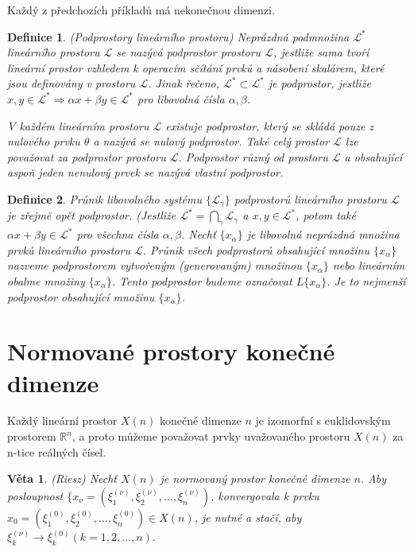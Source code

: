 \documentclass[a4paper, 11pt]{report}
\newtheorem{mydef}{Definice}[chapter]
\newtheorem{veta}{Věta}[chapter]
\begin{document}
Každý z předchozích příkladů má nekonečnou dimenzi.

\begin{mydef}
(Podprostory lineárního prostoru) Neprázdná podmnožina $\mathcal{L}^*$ lineárního prostoru $\mathcal{L}$ se nazývá \emph{podprostor} prostoru $\mathcal{L}$, jestliže sama tvoří lineární prostor vzhledem k operacím sčítání prvků a násobení skalárem, které jsou definovány v prostoru $\mathcal{L}$. Jinak řečeno, $\mathcal{L}^* \subset \mathcal{L}^*$ je podprostor, jestliže
$x,y \in \mathcal{L}^* \Rightarrow \alpha x + \beta y \in \mathcal{L}^*$
pro libovolná čísla $\alpha, \beta$.

V každém lineárním prostoru $\mathcal{L}$ existuje podprostor, který se skládá pouze z nulového prvku $\theta$ a nazývá se \emph{nulový podprostor}. Také celý prostor $\mathcal{L}$ lze považovat za podprostor prostoru $\mathcal{L}$. Podprostor různý od prostoru $\mathcal{L}$ a obsahující aspoň jeden nenulový prvek se nazývá \emph{vlastní podprostor}.
\end{mydef}

\begin{mydef}
Průnik libovolného systému $\{\mathcal{L}_\gamma\}$ podprostorů lineárního prostoru $\mathcal{L}$ je zřejmě opět podprostor.
(Jestliže $\mathcal{L}^* = \bigcap\limits_\gamma \mathcal{L}_\gamma$ a $x, y \in \mathcal{L}^*$, potom také $\alpha x + \beta y \in \mathcal{L}^*$ pro všechna čísla $\alpha, \beta$.
Nechť  $\{x_\alpha\}$ je libovolná neprázdná množina prvků lineárního prostoru $\mathcal{L}$. Průnik všech podprostorů obsahující množinu $\{x_\alpha\}$ nazveme \emph{podprostorem vytvořeným (generovaným) množinou} $\{x_\alpha\}$ nebo \emph{lineárním obalme množiny} $\{x_\alpha\}$. Tento podprostor budeme označovat $L\{x_\alpha\}$. Je to nejmenší podprostor obsahující množinu $\{x_\alpha\}$.
\end{mydef}

\section{Normované prostory konečné dimenze}

Každý lineární prostor $X(n)$ konečné dimenze $n$ je izomorfní s euklidovským prostorem $\mathbb{R}^n$, a proto můžeme považovat prvky uvažovaného prostoru $X(n)$ za n-tice reálných čísel.

\begin{veta}
(Riesz) Nechť $X(n)$ je normovaný prostor konečné dimenze $n$. Aby posloupnost
$\{x_\nu = (\xi_1^{(\nu)}, \xi_2^{(\nu)}, \dots, \xi_n^{(\nu)})$,
konvergovala k prvku
$x_0 = (\xi_1^{(0)}, \xi_2^{(0)}, \dots, \xi_n^{(0)}) \in X(n)$, je nutné a stačí, aby
$\xi_k^{(\nu)} \to \xi_k^{(0)} (k = 1, 2, \dots, n).$
\end{veta}
\end{document}
